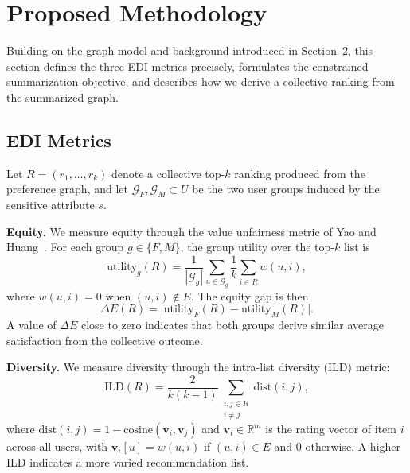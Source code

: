 \documentclass[runningheads]{llncs}
\begin{document}
\section{Proposed Methodology}\label{sec:methodology}

Building on the graph model and background introduced in Section~2, this section
defines the three EDI metrics precisely, formulates the constrained summarization
objective, and describes how we derive a collective ranking from the summarized
graph.

\subsection{EDI Metrics}

Let $R = (r_1, \ldots, r_k)$ denote a collective top-$k$ ranking produced from
the preference graph, and let $\mathcal{G}_F, \mathcal{G}_M \subset U$ be the
two user groups induced by the sensitive attribute $s$.

\smallskip\noindent\textbf{Equity.}
We measure equity through the value unfairness metric of Yao and
Huang~\cite{yao_new_2017}. For each group $g \in \{F, M\}$, the group utility
over the top-$k$ list is
\begin{equation}
  \mathrm{utility}_g(R)
    = \frac{1}{|\mathcal{G}_g|}
      \sum_{u \in \mathcal{G}_g}
      \frac{1}{k} \sum_{i \in R} w(u, i),
\end{equation}
where $w(u,i)=0$ when $(u,i)\notin E$. The equity gap is then
\begin{equation}
  \Delta E(R) = \bigl|\mathrm{utility}_F(R) - \mathrm{utility}_M(R)\bigr|.
\end{equation}
A value of $\Delta E$ close to zero indicates that both groups derive similar
average satisfaction from the collective outcome.

\smallskip\noindent\textbf{Diversity.}
We measure diversity through the intra-list diversity (ILD) metric:
\begin{equation}
  \mathrm{ILD}(R) = \frac{2}{k(k-1)}
    \sum_{\substack{i,j \in R \\ i \neq j}} \mathrm{dist}(i,j),
\end{equation}
where $\mathrm{dist}(i,j) = 1 - \mathrm{cosine}(\mathbf{v}_i, \mathbf{v}_j)$
and $\mathbf{v}_i \in \mathbb{R}^m$ is the rating vector of item $i$ across all
users, with $\mathbf{v}_i[u] = w(u,i)$ if $(u,i)\in E$ and $0$ otherwise.
A higher ILD indicates a more varied recommendation list.
\end{document}
